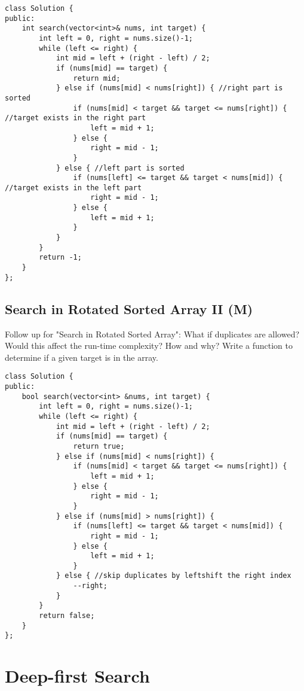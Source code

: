 \begin{lstlisting}
class Solution {
public:
    int search(vector<int>& nums, int target) {
        int left = 0, right = nums.size()-1;
        while (left <= right) {
            int mid = left + (right - left) / 2;
            if (nums[mid] == target) {
                return mid;
            } else if (nums[mid] < nums[right]) { //right part is sorted
                if (nums[mid] < target && target <= nums[right]) { //target exists in the right part
                    left = mid + 1;
                } else {
                    right = mid - 1;
                }            
            } else { //left part is sorted
                if (nums[left] <= target && target < nums[mid]) { //target exists in the left part
                    right = mid - 1;
                } else {
                    left = mid + 1;
                }
            }
        }
        return -1;
    }
};
\end{lstlisting}


\subsection{Search in Rotated Sorted Array II (M)}
Follow up for "Search in Rotated Sorted Array":
What if duplicates are allowed?
Would this affect the run-time complexity? How and why?
Write a function to determine if a given target is in the array.\\

\begin{lstlisting}
class Solution {
public:
    bool search(vector<int> &nums, int target) {
        int left = 0, right = nums.size()-1;
        while (left <= right) {
            int mid = left + (right - left) / 2;
            if (nums[mid] == target) {
                return true;
            } else if (nums[mid] < nums[right]) {
                if (nums[mid] < target && target <= nums[right]) {
                    left = mid + 1;
                } else {
                    right = mid - 1;
                }
            } else if (nums[mid] > nums[right]) {
                if (nums[left] <= target && target < nums[mid]) {
                    right = mid - 1;
                } else {
                    left = mid + 1;
                }
            } else { //skip duplicates by leftshift the right index
                --right;
            }
        }
        return false;
    }
};
\end{lstlisting}


\section{Deep-first Search}
